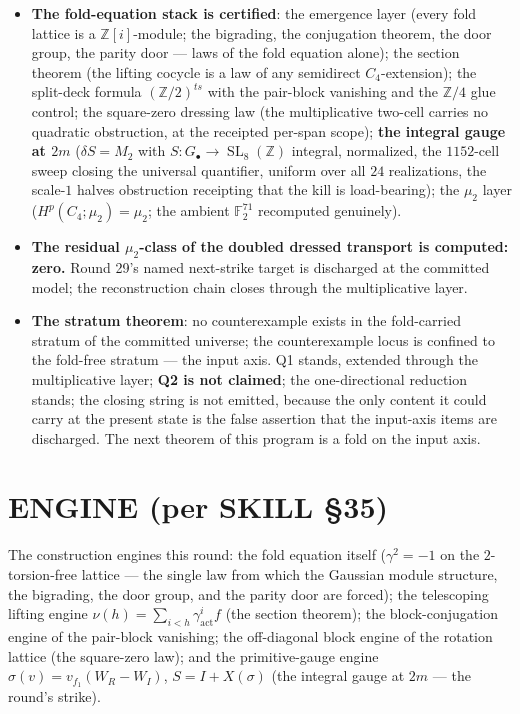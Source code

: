 \documentclass[11pt]{article}
\newcommand{\Z}{\mathbb Z}
\newcommand{\F}{\mathbb F}
\newcommand{\SL}{\operatorname{SL}}
\begin{document}
\begin{itemize}
\item \textbf{The fold-equation stack is certified}: the emergence
layer (every fold lattice is a $\Z[i]$-module; the bigrading, the
conjugation theorem, the door group, the parity door --- laws of the
fold equation alone); the section theorem (the lifting cocycle is a
law of any semidirect $C_4$-extension); the split-deck formula
$(\Z/2)^{ts}$ with the pair-block vanishing and the $\Z/4$ glue
control; the square-zero dressing law (the multiplicative two-cell
carries no quadratic obstruction, at the receipted per-span scope);
\textbf{the integral gauge at $2m$} ($\delta S=M_2$ with
$S\colon G_\bullet\to\SL_8(\Z)$ integral, normalized, the $1152$-cell
sweep closing the universal quantifier, uniform over all $24$
realizations, the scale-$1$ halves obstruction receipting that the
kill is load-bearing); the $\mu_2$ layer
($H^p(C_4;\mu_2)=\mu_2$; the ambient $\F_2^{71}$ recomputed
genuinely).
\item \textbf{The residual $\mu_2$-class of the doubled dressed
transport is computed: zero.} Round 29's named next-strike target is
discharged at the committed model; the reconstruction chain closes
through the multiplicative layer.
\item \textbf{The stratum theorem}: no counterexample exists in the
fold-carried stratum of the committed universe; the counterexample
locus is confined to the fold-free stratum --- the input axis. Q1
stands, extended through the multiplicative layer; \textbf{Q2 is not
claimed}; the one-directional reduction stands; the closing string is
not emitted, because the only content it could carry at the present
state is the false assertion that the input-axis items are
discharged. The next theorem of this program is a fold on the input
axis.
\end{itemize}

\section*{ENGINE (per SKILL §35)}

The construction engines this round: the fold equation itself
($\gamma^2=-1$ on the $2$-torsion-free lattice --- the single law
from which the Gaussian module structure, the bigrading, the door
group, and the parity door are forced); the telescoping lifting
engine $\nu(h)=\sum_{i<h}\gamma_{\mathrm{act}}^if$ (the section
theorem); the block-conjugation engine of the pair-block vanishing;
the off-diagonal block engine of the rotation lattice (the square-zero
law); and the primitive-gauge engine
$\sigma(v)=v_{f_1}(W_R-W_I)$, $S=I+X(\sigma)$ (the integral gauge at
$2m$ --- the round's strike).
\end{document}

